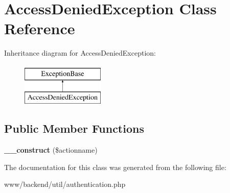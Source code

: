 \hypertarget{classAccessDeniedException}{
\section{AccessDeniedException Class Reference}
\label{classAccessDeniedException}
}
Inheritance diagram for AccessDeniedException:\begin{figure}[H]
\begin{center}
\leavevmode
\includegraphics[height=2.000000cm]{classAccessDeniedException}
\end{center}
\end{figure}
\subsection*{Public Member Functions}
\begin{DoxyCompactItemize}
\item 
\hypertarget{classAccessDeniedException_a3a82de34e6a66f435b43fda664ccc89c}{
{\bfseries \_\-\_\-construct} (\$actionname)}
\label{classAccessDeniedException_a3a82de34e6a66f435b43fda664ccc89c}

\end{DoxyCompactItemize}


The documentation for this class was generated from the following file:\begin{DoxyCompactItemize}
\item 
www/backend/util/authentication.php\end{DoxyCompactItemize}
